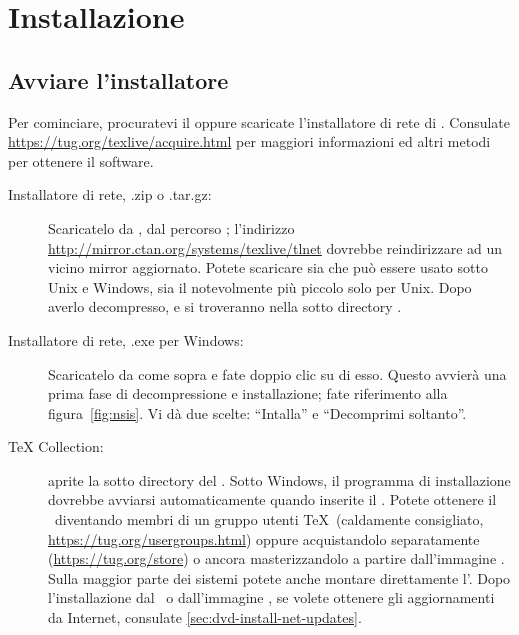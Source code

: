 \documentclass{article}
\begin{document}
\section{Installazione}
\label{sec:install}

\subsection{Avviare l'installatore}
\label{sec:inst-start}

Per cominciare, procuratevi il \DVD{} \TK{} oppure scaricate
l'installatore di rete di \TL. Consulate
\url{https://tug.org/texlive/acquire.html} per maggiori informazioni ed
altri metodi per ottenere il software.

\begin{description} \item [Installatore di rete, .zip o .tar.gz:]
Scaricatelo da \CTAN, dal percorso ;
l'indirizzo \url{http://mirror.ctan.org/systems/texlive/tlnet}
dovrebbe reindirizzare ad un vicino mirror aggiornato. Potete
scaricare sia  che può essere usato sotto
Unix e Windows, sia il notevolmente più piccolo
 solo per Unix. Dopo averlo
decompresso,  e
 si troveranno nella sotto
directory .

\item [Installatore di rete, .exe per Windows:] Scaricatelo da \CTAN{}
come sopra e fate doppio clic su di esso. Questo avvierà una prima fase
di decompressione e installazione; fate riferimento alla
figura~\ref{fig:nsis}. Vi dà due scelte: ``Intalla'' e
``Decomprimi soltanto''.

\item [\DVD{} \TeX{} Collection:] aprite la sotto directory
 del \DVD. Sotto Windows, il programma di installazione
dovrebbe avviarsi automaticamente quando inserite il \DVD. Potete ottenere il
\DVD\ diventando membri di un gruppo utenti \TeX\ (caldamente consigliato,
\url{https://tug.org/usergroups.html}) oppure acquistandolo separatamente
(\url{https://tug.org/store}) o ancora masterizzandolo a partire
dall'immagine \ISO. Sulla maggior parte dei sistemi potete anche montare
direttamente l'\ISO. Dopo l'installazione dal \DVD\ o dall'immagine \ISO, se
volete ottenere gli aggiornamenti da Internet, consulate
\ref{sec:dvd-install-net-updates}.

\end{description}
\end{document}
